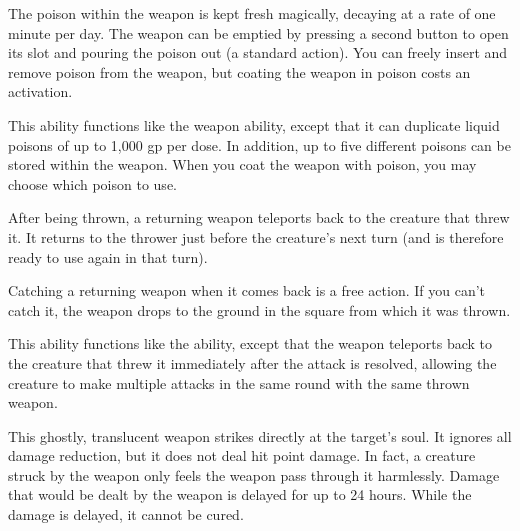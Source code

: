 The poison within the weapon is kept fresh magically, decaying at a rate of one minute per day. The weapon can be emptied by pressing a second button to open its slot and pouring the poison out (a standard action). You can freely insert and remove poison from the weapon, but coating the weapon in poison costs an activation.


 This ability functions like the  weapon ability, except that it can duplicate liquid poisons of up to 1,000 gp per dose. In addition, up to five different poisons can be stored within the weapon. When you coat the weapon with poison, you may choose which poison to use.


 After being thrown, a returning weapon teleports back to the creature that threw it. It returns to the thrower just before the creature's next turn (and is therefore ready to use again in that turn).

Catching a returning weapon when it comes back is a free action. If you can't catch it, the weapon drops to the ground in the square from which it was thrown.


 This ability functions like the  ability, except that the weapon teleports back to the creature that threw it immediately after the attack is resolved, allowing the creature to make multiple attacks in the same round with the same thrown weapon. 


 This ghostly, translucent weapon strikes directly at the target's soul. It ignores all damage reduction, but it does not deal hit point damage. In fact, a creature struck by the weapon only feels the weapon pass through it harmlessly. Damage that would be dealt by the weapon is delayed for up to 24 hours. While the damage is delayed, it cannot be cured.

